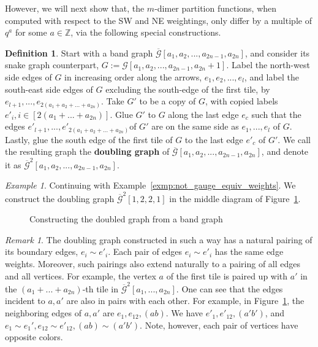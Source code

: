 \documentclass[11pt]{amsart}
\theoremstyle{definition}
\newtheorem{defn}[thm]{Definition}
\theoremstyle{remark}
\newtheorem{exmp}[thm]{Example}
\newtheorem{rem}[thm]{Remark}
\numberwithin{equation}{section}
\begin{document}
However, we will next show that, the $m$-dimer partition functions, when computed with respect to the SW and NE weightings, only differ by a multiple of $q^{a}$ for some $a\in \mathbb{Z}$, via the following special constructions.

\begin{defn}
    Start with a band graph $\overline{\mathcal{G}}[a_1,a_2,...,a_{2n-1},a_{2n}]$, and consider its snake graph counterpart, $G := \mathcal{G}[a_1,a_2,...,a_{2n-1},a_{2n}+1]$. Label the north-west side edges of $G$ in increasing order along the arrows, $e_1,e_2,...,e_{l}$, and label the south-east side edges of $G$ excluding the south-edge of the first tile, by $e_{l+1},...,e_{2(a_1+a_2+...+a_{2n})}$. Take $G'$ to be a copy of $G$, with copied labels $e'_i, i\in [2(a_1+...+a_{2n})]$. Glue $G'$ to $G$ along the last edge $e_c$ such that the edges $e'_{l+1},...,e'_{2(a_1+a_2+...+a_{2n})}$of $G'$ are on the same side as $e_1,...,e_{l}$ of $G$. Lastly, glue the south edge of the first tile of $G$ to the last edge $e'_c$ of $G'$. We call the resulting graph the \textbf{doubling graph} of $\overline{\mathcal{G}}[a_1,a_2,...,a_{2n-1},a_{2n}]$, and denote it as $\overline{\mathcal{G}}^2[a_1,a_2,...,a_{2n-1},a_{2n}]$.
\end{defn}

\begin{exmp}\label{exmp: doubling_graph}
Continuing with Example~\ref{exmp:not_gauge_equiv_weights}. We construct the doubling graph $\overline{\mathcal{G}}^2[1,2,2,1]$ in the middle diagram of Figure~\ref{fig:doubling_graph_ex}.
    \begin{figure}[h!]
    \centering
    
    \caption{Constructing the doubled graph from a band graph}
    \label{fig:doubling_graph_ex}
    \end{figure}
\end{exmp}

\begin{rem}\label{rem: pairing_rules}
    The doubling graph constructed in such a way has a natural pairing of its boundary edges, $e_i\sim e'_i$. Each pair of edges $e_i\sim e'_i$ has the same edge weights. Moreover, such pairings also extend naturally to a pairing of all edges and all vertices. For example, the vertex $a$ of the first tile is paired up with $a'$ in the $(a_1+...+a_{2n})$-th tile in $\overline{\mathcal{G}}^2[a_1,...,a_{2n}]$. One can see that the edges incident to $a,a'$ are also in pairs with each other. For example, in Figure~\ref{fig:doubling_graph_ex}, the neighboring edges of $a,a'$ are $e_1,e_{12}, (ab)$. We have $e'_1,e'_{12}, (a'b')$, and $e_1\sim e_1',e_{12}\sim e'_{12}, (ab)\sim (a'b')$. Note, however, each pair of vertices have opposite colors.  
\end{rem}
\end{document}
